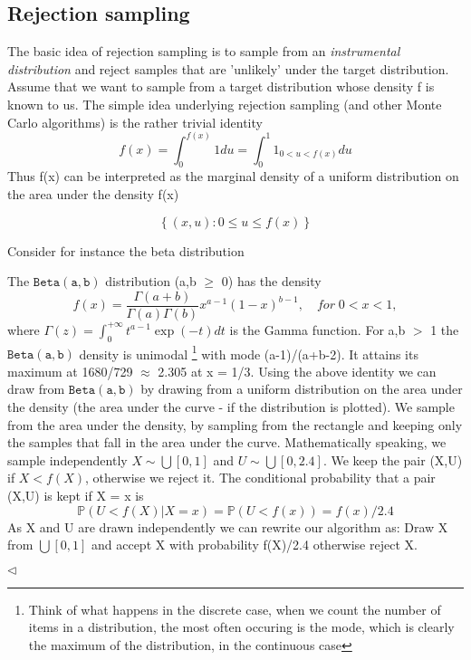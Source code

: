 \documentclass[a4paper,10pt]{article}
\newcommand{\lt}{<}
\newcommand{\gt}{>}
\newenvironment{example}[1][Example]{\begin{trivlist}
\item[\hskip \labelsep {\bfseries #1}]}{\end{trivlist}}
\begin{document}
 \subsection{Rejection sampling}
 The basic idea of rejection sampling is to sample from an \textit{instrumental distribution} and reject samples
 that are 'unlikely' under the target distribution.
    Assume that we want to sample from a target distribution whose density f is known to us. The simple idea
    underlying rejection sampling (and other Monte Carlo algorithms) is the rather trivial identity
    \begin{equation*}
     f(x) = \int^{f(x)}_{0} 1 du = \int^1_0 1 _{0\lt u \lt f(x)} du
    \end{equation*}
Thus f(x) can be interpreted as the marginal density of a uniform distribution on the area under the density f(x)
\begin{center}
\begin{equation*}
 \left\lbrace (x,u):0\leq u\leq f(x)\right\rbrace
\end{equation*}\end{center}
     Consider for instance the beta distribution
     \begin{example}[Sampling from a Beta distribution]\label{3.3}
     The $\mathtt{Beta(a,b)}$ distribution (a,b $\geq$ 0) has the density
     \begin{equation*}
      f(x) = \dfrac{\Gamma(a + b)}{\Gamma(a)\Gamma(b)}x^{a-1}(1-x)^{b-1},\quad for\;0\lt x \lt 1,
     \end{equation*}
where $\Gamma(z) = \int^{+\infty}_{0}t^{a-1}\exp(-t)dt$ is the Gamma function. For a,b $\gt$ 1 the $\mathtt{Beta(a,b)}$ density
is unimodal \footnote{Think of what happens in the discrete case, when we count the number of items in a distribution,
the most often occuring is the mode, which is clearly the maximum of the distribution, in the continuous case} with
mode (a-1)/(a+b-2). It attains its maximum at 1680/729 $\approx$ 2.305 at x = 1/3.
Using the above identity we can draw from $\mathtt{Beta(a,b)}$ by drawing from a uniform distribution on the area 
under the density (the area under the curve - if the distribution is plotted). We sample from the area under the 
density, by sampling from the rectangle and keeping only the samples that fall in the area under the curve. 
Mathematically speaking, we sample independently $X \sim \bigcup[0,1]$ and $U \sim \bigcup[0,2.4]$.
We keep the pair (X,U) if $X \lt f(X)$, otherwise we reject it.
The conditional probability that a pair (X,U) is kept if X = x is 
\begin{equation*}
 \mathbb{P}(U \lt f(X)|X = x) = \mathbb{P}(U \lt f(x)) = f(x)/2.4
\end{equation*}
As X and U are drawn independently we can rewrite our algorithm as: Draw X from $\bigcup[0,1]$ and accept X with
probability f(X)/2.4 otherwise reject X.
 
      \quad\quad\quad$\triangleleft$
     \end{example}
\end{document}
